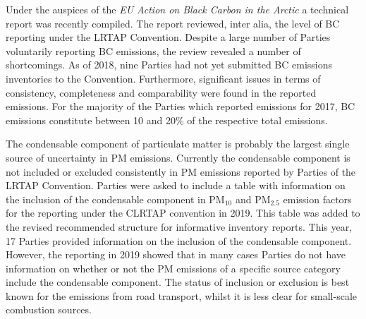 Under the auspices of the {\it EU Action on Black Carbon in the Arctic} a technical report  %
was recently compiled. The report reviewed, inter alia, the level of BC reporting under the LRTAP Convention.
Despite a large number of Parties voluntarily reporting BC emissions, the review
revealed a number of shortcomings. As of 2018, nine Parties had not yet submitted BC emissions inventories to the
Convention. Furthermore, significant issues in terms
of consistency, completeness and comparability were found in the reported emissions.
For the majority of the Parties which reported
emissions for 2017, BC emissions constitute
between 10 and 20\% of the respective total \pmfine emissions.


The condensable component of particulate matter is probably the largest single source of uncertainty in PM emissions. Currently the condensable component is not included or excluded consistently in PM emissions reported by Parties
of the LRTAP Convention. Parties were asked to include a table with information on the inclusion of the condensable component in PM$_{10}$ and PM$_{2.5}$
emission factors for the reporting under the CLRTAP convention in 2019. This table was added to the revised
recommended structure for informative inventory reports. This year, 17 Parties
provided information on the inclusion of the condensable component.
However, the reporting in 2019 showed
that in many cases Parties do not have information on whether or not the PM emissions of a specific source category include the
condensable component. The status of inclusion or exclusion is best known for the emissions from road transport, whilst it is less clear for small-scale combustion sources.

